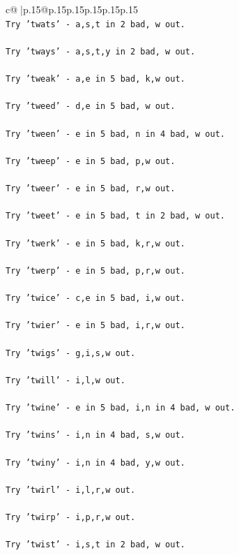 \documentclass{article}
\begin{document}
{\begin{supertabular}{c@{$\;$}|p{.15\linewidth}@{}p{.15\linewidth}p{.15\linewidth}p{.15\linewidth}p{.15\linewidth}p{.15\linewidth}}
{{{\\ 
\texttt{Try 'twats' {-} a,s,t in 2 bad, w out.} \\
\\ 
\texttt{Try 'tways' {-} a,s,t,y in 2 bad, w out.} \\
\\ 
\texttt{Try 'tweak' {-} a,e in 5 bad, k,w out.} \\
\\ 
\texttt{Try 'tweed' {-} d,e in 5 bad, w out.} \\
\\ 
\texttt{Try 'tween' {-} e in 5 bad, n in 4 bad, w out.} \\
\\ 
\texttt{Try 'tweep' {-} e in 5 bad, p,w out.} \\
\\ 
\texttt{Try 'tweer' {-} e in 5 bad, r,w out.} \\
\\ 
\texttt{Try 'tweet' {-} e in 5 bad, t in 2 bad, w out.} \\
\\ 
\texttt{Try 'twerk' {-} e in 5 bad, k,r,w out.} \\
\\ 
\texttt{Try 'twerp' {-} e in 5 bad, p,r,w out.} \\
\\ 
\texttt{Try 'twice' {-} c,e in 5 bad, i,w out.} \\
\\ 
\texttt{Try 'twier' {-} e in 5 bad, i,r,w out.} \\
\\ 
\texttt{Try 'twigs' {-} g,i,s,w out.} \\
\\ 
\texttt{Try 'twill' {-} i,l,w out.} \\
\\ 
\texttt{Try 'twine' {-} e in 5 bad, i,n in 4 bad, w out.} \\
\\ 
\texttt{Try 'twins' {-} i,n in 4 bad, s,w out.} \\
\\ 
\texttt{Try 'twiny' {-} i,n in 4 bad, y,w out.} \\
\\ 
\texttt{Try 'twirl' {-} i,l,r,w out.} \\
\\ 
\texttt{Try 'twirp' {-} i,p,r,w out.} \\
\\ 
\texttt{Try 'twist' {-} i,s,t in 2 bad, w out.} \\
}}}
\end{supertabular}}
\end{document}
